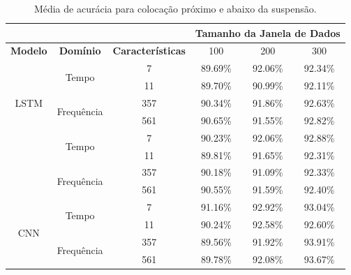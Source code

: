 \begin{table}[h!]
\scriptsize
\centering
\caption{Média de acurácia para colocação próximo e abaixo da suspensão.}
\label{table:below_suspension_results_tipo_superficie_2}
\begin{tabular}{cccccc}
\cmidrule(l){4-6} & \multicolumn{1}{l}{\textbf{}} & \multicolumn{1}{l}{} & \multicolumn{3}{c}{\textbf{Tamanho da Janela de Dados}} \\ \midrule
\textbf{Modelo} & \textbf{Domínio} & \textbf{Características} & \multicolumn{1}{c}{100} & \multicolumn{1}{c}{200} & \multicolumn{1}{c}{300} \\ \midrule
\multirow{5}{*}{LSTM} & \multirow{2}{*}{Tempo} 
& 7 & 89.69\% & 92.06\% & 92.34\% \\ \cmidrule(l){3-6} 
&  & 11 & 89.70\% & 90.99\% & 92.11\% \\ \cmidrule(l){2-6} 
& \multirow{2}{*}{Frequência} 
& 357 & 90.34\% & 91.86\% & 92.63\% \\ \cmidrule(l){3-6} 
&  & 561 & 90.65\% & 91.55\% & \cellcolor[HTML]{34FF34}92.82\% \\ \midrule
\multirow{5}{*}{GRU} & \multirow{2}{*}{Tempo} 
& 7 & 90.23\% & 92.06\% & \cellcolor[HTML]{34FF34}92.88\% \\ \cmidrule(l){3-6} 
&  & 11 & 89.81\% & 91.65\% & 92.31\% \\ \cmidrule(l){2-6} 
 & \multirow{2}{*}{Frequência} & 357 & 90.18\% & 91.09\% & 92.33\% \\ \cmidrule(l){3-6} 
 &  & 561 & 90.55\% & 91.59\% & 92.40\% \\ \midrule
\multirow{5}{*}{CNN} & \multirow{2}{*}{Tempo} & 7 & 91.16\% & 92.92\% & 93.04\% \\ \cmidrule(l){3-6} 
 &  & 11 & 90.24\% & 92.58\% & 92.60\% \\ \cmidrule(l){2-6} 
 & \multirow{2}{*}{Frequência} & 357 & 89.56\% & 91.92\% & \cellcolor[HTML]{34FF34}93.91\% \\ \cmidrule(l){3-6} 
 &  & 561 & 89.78\% & 92.08\% & 93.67\% \\ \bottomrule
\end{tabular}
\end{table}

